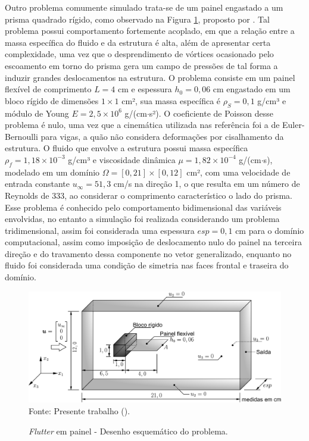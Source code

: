 Outro problema comumente simulado trata-se de um painel engastado a um prisma quadrado rígido, como observado na Figura \ref{fig:FSI-prism}, proposto por . Tal problema possui comportamento fortemente acoplado, em que a relação entre a massa específica do fluido e da estrutura é alta, além de apresentar certa complexidade, uma vez que o desprendimento de vórtices ocasionado pelo escoamento em torno do prisma gera um campo de pressões de tal forma a induzir grandes deslocamentos na estrutura. O problema consiste em um painel flexível de comprimento $L=4$ cm e espessura $h_0=0,06$ cm engastado em um bloco rígido de dimensões $1\times 1$ cm², sua massa específica é $\rho_S=0,1$ g/cm³ e módulo de Young $E=2,5\times 10^6$ g/(cm$\cdot$s²). O coeficiente de Poisson desse problema é nulo, uma vez que a cinemática utilizada nas referência foi a de Euler-Bernoulli para vigas, a quão não considera deformações por cisalhamento da estrutura. O fluido que envolve a estrutura possui massa específica $\rho_f=1,18\times10^{-3}$ g/cm³ e viscosidade dinâmica $\mu=1,82\times10^{-4}$ g/(cm$\cdot$s), modelado em um domínio $\Omega=[0,21]\times[0,12]$ cm², com uma velocidade de entrada constante $u_\infty=51,3$ cm/s na direção 1, o que resulta em um número de Reynolds de $333$, ao considerar o comprimento característico o lado do prisma. Esse problema é conhecido pelo comportamento bidimensional das variáveis envolvidas, no entanto a simulação foi realizada considerando um problema tridimensional, assim foi considerada uma espessura $esp=0,1$ cm para o domínio computacional, assim como imposição de deslocamento nulo do painel na terceira direção e do travamento dessa componente no vetor generalizado, enquanto no fluido foi considerada uma condição de simetria nas faces frontal e traseira do domínio.

\begin{figure}[h!]
    \centering
    \caption{\textit{Flutter} em painel - Desenho esquemático do problema.}
    \includegraphics[width=\linewidth]{Figuras/FSI-prism/FSI-prism3D.pdf}
    \\Fonte: Presente trabalho (\the\year).
    \label{fig:FSI-prism}
\end{figure}

